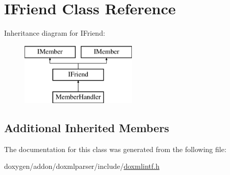 \hypertarget{class_i_friend}{}\section{I\+Friend Class Reference}
\label{class_i_friend}
Inheritance diagram for I\+Friend\+:\begin{figure}[H]
\begin{center}
\leavevmode
\includegraphics[height=3.000000cm]{class_i_friend}
\end{center}
\end{figure}
\subsection*{Additional Inherited Members}


The documentation for this class was generated from the following file\+:\begin{DoxyCompactItemize}
\item 
doxygen/addon/doxmlparser/include/\mbox{\hyperlink{include_2doxmlintf_8h}{doxmlintf.\+h}}\end{DoxyCompactItemize}
